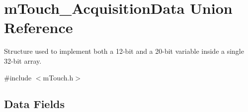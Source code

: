 \hypertarget{unionm_touch___acquisition_data}{}\section{m\+Touch\+\_\+\+Acquisition\+Data Union Reference}
\label{unionm_touch___acquisition_data}


Structure used to implement both a 12-\/bit and a 20-\/bit variable inside a single 32-\/bit array.  




{\ttfamily \#include $<$m\+Touch.\+h$>$}

\subsection*{Data Fields}
